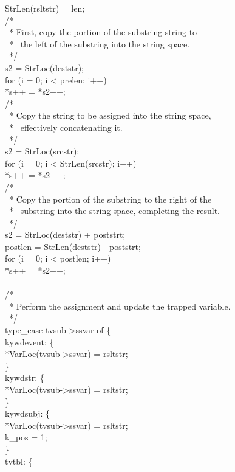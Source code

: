 \begin{iconcode}
\>StrLen(rsltstr) = len;\\
\>/*\\
\>\ * First, copy the portion of the substring string to\\
\>\ * \ the left of the substring into the string space.\\
\>\ */\\
\>s2 = StrLoc(deststr);\\
\>for (i = 0; i < prelen; i++)\\
\>\>*s++ = *s2++;\\
\>/*\\
\>\ * Copy the string to be assigned into the string space,\\
\>\ * \ effectively concatenating it.\\
\>\ */\\
\>s2 = StrLoc(srcstr);\\
\>for (i = 0; i < StrLen(srcstr); i++)\\
\>\>*s++ = *s2++;\\
\>/*\\
\>\ * Copy the portion of the substring to the right of the\\
\>\ * \ substring into the string space, completing the result.\\
\>\ */\\
\>s2 = StrLoc(deststr) + poststrt;\\
\>postlen = StrLen(deststr) - poststrt;\\
\>for (i = 0; i < postlen; i++)\\
\>\>*s++ = *s2++;\\
\\
\>/*\\
\>\ * Perform the assignment and update the trapped variable.\\
\>\ */\\
\>type\_case tvsub->ssvar of \{\\
\>\>kywdevent: \{\\
\>\>\>*VarLoc(tvsub->ssvar) = rsltstr;\\
\>\>\>\}\\
\>\>kywdstr: \{\\
\>\>\>*VarLoc(tvsub->ssvar) = rsltstr;\\
\>\>\>\}\\
\>\>kywdsubj: \{\\
\>\>\>*VarLoc(tvsub->ssvar) = rsltstr;\\
\>\>\>k\_pos = 1;\\
\>\>\>\}\\
\>\>tvtbl: \{\\

\end{iconcode}
